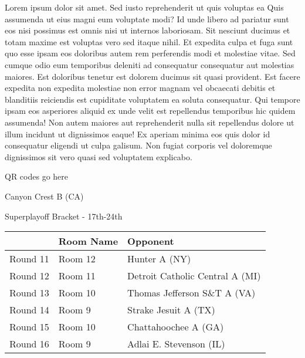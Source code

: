 \documentclass{article}%
\begin{document}
\vspace*{8pt}%
\linebreak%
\newline%
\newline%
    Lorem ipsum dolor sit amet. Sed iusto reprehenderit ut quis voluptas ea Quis assumenda ut eius magni eum voluptate modi? Id unde libero ad pariatur sunt eos nisi possimus est omnis nisi ut internos laboriosam. Sit nesciunt ducimus et totam maxime est voluptas vero sed itaque nihil. Et expedita culpa et fuga sunt quo esse ipsam eos doloribus autem rem perferendis modi et molestiae vitae.\newline%
\newline%
    Sed cumque odio eum temporibus deleniti ad consequatur consequatur aut molestias maiores. Est doloribus tenetur est dolorem ducimus sit quasi provident. Est facere expedita non expedita molestiae non error magnam vel obcaecati debitis et blanditiis reiciendis est cupiditate voluptatem ea soluta consequatur. Qui tempore ipsam eos asperiores aliquid ex unde velit est repellendus temporibus hic quidem assumenda!\newline%
\newline%
    Non autem maiores aut reprehenderit nulla sit repellendus dolore ut illum incidunt ut dignissimos eaque! Ex aperiam minima eos quis dolor id consequatur eligendi ut culpa galisum. Non fugiat corporis vel doloremque dignissimos sit vero quasi sed voluptatem explicabo.\newline%
\newline%
\vspace*{30pt}%
\begin{center}%
\begin{Huge}%
QR codes go here%
\end{Huge}%
\end{center}%
\newpage%
\begin{center}%
\begin{Huge}%
Canyon Crest B (CA)%
\end{Huge}%
\vspace*{8pt}%
\linebreak%
\begin{Large}%
Superplayoff Bracket {-} 17th{-}24th%
\end{Large}%
\end{center}%
%
\begin{tabularx}{\textwidth}{|c|Y|Y|}%
\hline%
&Room Name&Opponent\\%
\hline%
Round 11&Room 12&Hunter A (NY)\\%
Round 12&Room 11&Detroit Catholic Central A (MI)\\%
Round 13&Room 10&Thomas Jefferson S\&T A (VA)\\%
Round 14&Room 9&Strake Jesuit A (TX)\\%
Round 15&Room 10&Chattahoochee A (GA)\\%
Round 16&Room 9&Adlai E. Stevenson (IL)\\%
\hline%
\end{tabularx}%
\end{document}
